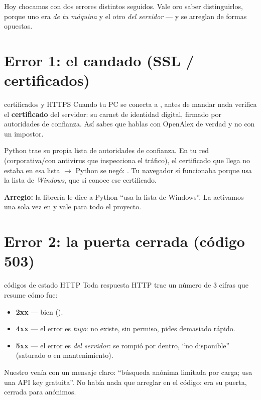 \documentclass[11pt,a4paper]{article}
\begin{document}
Hoy chocamos con dos errores distintos seguidos. Vale oro saber distinguirlos, porque uno
era \emph{de tu máquina} y el otro \emph{del servidor} — y se arreglan de formas opuestas.

\section{Error 1: el candado (SSL / certificados)}

\begin{concepto}{certificados y HTTPS}
Cuando tu PC se conecta a , antes de mandar nada verifica
el \textbf{certificado} del servidor: su carnet de identidad digital, firmado por
autoridades de confianza. Así sabes que hablas con OpenAlex de verdad y no con un impostor.

Python trae su propia lista de autoridades de confianza. En tu red (corporativa/con
antivirus que inspecciona el tráfico), el certificado que llega no estaba en esa lista
$\rightarrow$ Python se negó: . Tu navegador sí
funcionaba porque usa la lista de \emph{Windows}, que sí conoce ese certificado.

\textbf{Arreglo:} la librería  le dice a Python ``usa la lista de
Windows''. La activamos una sola vez en  y vale para todo
el proyecto.
\end{concepto}

\section{Error 2: la puerta cerrada (código 503)}

\begin{concepto}{códigos de estado HTTP}
Toda respuesta HTTP trae un número de 3 cifras que resume cómo fue:
\begin{itemize}
  \item \textbf{2xx} --- bien ().
  \item \textbf{4xx} --- el error es \emph{tuyo}:  no existe,  sin permiso,
         pides demasiado rápido.
  \item \textbf{5xx} --- el error es \emph{del servidor}:  se rompió por dentro,
         ``no disponible'' (saturado o en mantenimiento).
\end{itemize}
Nuestro  venía con un mensaje claro: ``búsqueda anónima limitada por carga;
usa una API key gratuita''. No había nada que arreglar en el código: era su puerta, cerrada
para anónimos.
\end{concepto}
\end{document}
